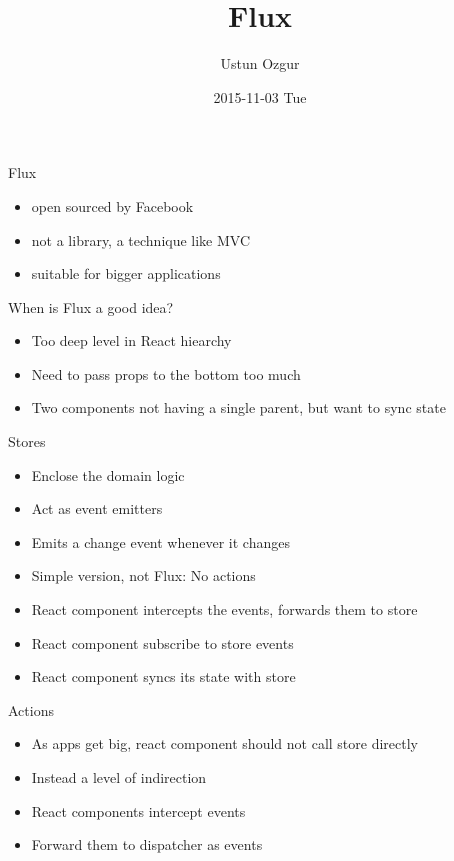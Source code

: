 \documentclass[presentation]{beamer}
\author{Ustun Ozgur}
\date{2015-11-03 Tue}
\title{Flux}
\begin{document}
\maketitle


\begin{frame}[label={sec:orgheadline1}]{Flux}
\begin{itemize}
\item open sourced by Facebook
\item not a library, a technique like MVC
\item suitable for bigger applications
\end{itemize}
\end{frame}

\begin{frame}[label={sec:orgheadline2}]{When is Flux a good idea?}
\begin{itemize}
\item Too deep level in React hiearchy
\item Need to pass props to the bottom too much
\item Two components not having a single parent, but want to sync state
\end{itemize}
\end{frame}


\begin{frame}[label={sec:orgheadline3}]{Stores}
\begin{itemize}
\item Enclose the domain logic
\item Act as event emitters
\item Emits a change event whenever it changes
\item Simple version, not Flux: No actions
\item React component intercepts the events, forwards them to store
\item React component subscribe to store events
\item React component syncs its state with store
\end{itemize}
\end{frame}

\begin{frame}[label={sec:orgheadline4}]{Actions}
\begin{itemize}
\item As apps get big, react component should not call store directly
\item Instead a level of indirection
\item React components intercept events
\item Forward them to dispatcher as events
\end{itemize}
\end{frame}
\end{document}
